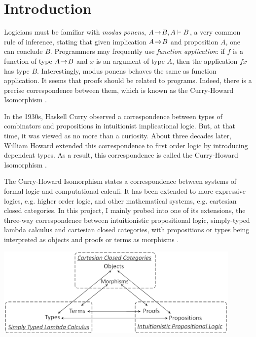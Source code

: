 \section{Introduction}
\label{sec:introduction}

Logicians must be familiar with \emph{modus ponens}, $ A \hspace{1pt}\mathord{\to}\hspace{1pt} B, A \vdash B $, a very common rule of inference, stating that given implication $ A \hspace{1pt}\mathord{\to}\hspace{1pt} B $ and proposition $ A $, one can conclude $ B $. Programmers may frequently use \emph{function application}: if $ f $ is a function of type $ A \hspace{1pt}\mathord{\to}\hspace{1pt} B $ and $ x $ is an argument of type $ A $, then the application $ f x $ has type $ B $. Interestingly, modus ponens behaves the same as function application. It seems that proofs should be related to programs. Indeed, there is a precise correspondence between them, which is known as the Curry-Howard Isomorphism \cite{Mit96,SU98}.

In the 1930s, Haskell Curry observed a correspondence between types of combinators and propositions in intuitionist implicational logic. But, at that time, it was viewed as no more than a curiosity. About three decades later, William Howard extended this correspondence to first order logic by introducing dependent types. As a result, this correspondence is called the Curry-Howard Isomorphism \cite{Hin97}.

The Curry-Howard Isomorphism states a correspondence between systems of formal logic and computational calculi. It has been extended to more expressive logics, e.g. higher order logic, and other mathematical systems, e.g. cartesian closed categories. In this project, I mainly probed into one of its extensions, the three-way correspondence between intuitionistic propositional logic, simply-typed lambda calculus and cartesian closed categories, with propositions or types being interpreted as objects and proofs or terms as morphisms \cite{AL91,LS86,Mit96,Pit00}.

\begin{center}
\includegraphics[width=0.9\textwidth]{./images/triangle}
\end{center}

